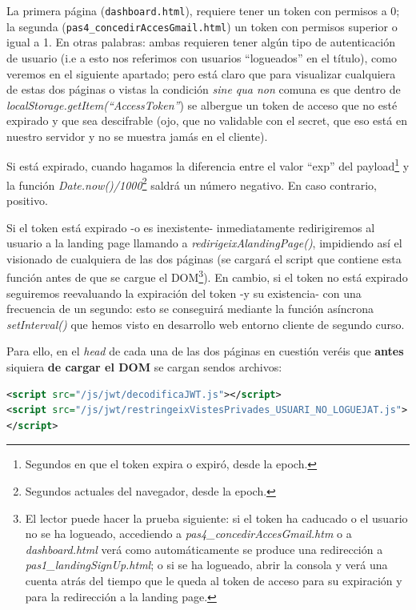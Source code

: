 \documentclass[a4paper,12pt]{report}
\begin{document}
	La primera página (\texttt{dashboard.html}), requiere tener un token con permisos a 0; la segunda (\texttt{pas4\_concedirAccesGmail.html}) un token con permisos superior o igual a 1. En otras palabras: ambas requieren tener algún tipo de autenticación de usuario (i.e a esto nos referimos con usuarios ``logueados'' en el título), como veremos en el siguiente apartado; pero está claro que para visualizar cualquiera de estas dos páginas o vistas la condición \textit{sine qua non} comuna es que dentro de \textit{localStorage.getItem(``AccessToken''}) se albergue un token de acceso que no esté expirado y que sea descifrable (ojo, que no validable con el secret, que eso está en nuestro servidor y no se muestra jamás en el cliente).
	
	Si está expirado, cuando hagamos la diferencia entre el valor ``exp'' del payload\footnote{Segundos en que el token expira o expiró, desde la epoch.} y la función \textit{Date.now()/1000}\footnote{Segundos actuales del navegador, desde la epoch.} saldrá un número negativo. En caso contrario, positivo. 
	
	Si el token está expirado -o es inexistente- inmediatamente redirigiremos al usuario a la landing page llamando a \textit{redirigeixAlandingPage()}, impidiendo así el visionado de cualquiera de las dos páginas (se cargará el script que contiene esta función antes de que se cargue el DOM\footnote{El lector puede hacer la prueba siguiente: si el token ha caducado o el usuario no se ha logueado, accediendo a \textit{pas4\_concedirAccesGmail.htm} o a \textit{dashboard.html} verá como automáticamente se produce una redirección a \textit{pas1\_landingSignUp.html}; o si se ha logueado, abrir la consola y verá una cuenta atrás del tiempo que le queda al token de acceso para su expiración y para la redirección a la landing page.}). En cambio, si el token no está expirado seguiremos reevaluando la expiración del token -y su existencia- con una frecuencia de un segundo: esto se conseguirá mediante la función asíncrona \textit{setInterval()} que hemos visto en desarrollo web entorno cliente de segundo curso.
	
	Para ello, en el \textit{head} de cada una de las dos páginas en cuestión veréis que \textbf{antes} siquiera \textbf{de cargar el DOM} se cargan sendos archivos:
	
\begin{lstlisting}[language=xml, basicstyle=\ttfamily\footnotesize, keywordstyle=\color{magenta}]
<script src="/js/jwt/decodificaJWT.js"></script>
<script src="/js/jwt/restringeixVistesPrivades_USUARI_NO_LOGUEJAT.js">
</script>
\end{lstlisting}
	
\end{document}

